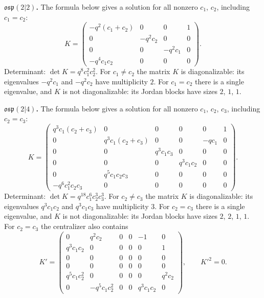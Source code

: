 \documentclass[12pt,a4paper]{article}
\newcommand{\osp}{\mathfrak{osp}}
\begin{document}
\textbf{$\osp(2|2)$.} The formula below gives a solution for all nonzero $c_1$, $c_2$, including $c_1=c_2$:
\begin{equation}  \label{Kosp(2|2)}
K=\begin{pmatrix}
-q^{2}(c_1+c_2) & 0 & 0 & 1 \\
0 & -q^{2}c_2 & 0 & 0 \\
0 & 0 & -q^{2}c_1 & 0 \\
-q^{4}c_1c_2 & 0 & 0 & 0
\end{pmatrix} .
\end{equation}
Determinant: $\det K=q^{8}c_1^2c_2^2$.
For $c_1\neq c_2$ the matrix $K$ is diagonalizable: its eigenvalues $-q^2c_1$ and $-q^2c_2$ have multiplicity $2$. For
$c_1=c_2$ there is a single eigenvalue, and $K$ is not diagonalizable: its Jordan blocks have sizes $2$, $1$, $1$.

\textbf{$\osp(2|4)$.} The formula below gives a solution for all nonzero $c_1$, $c_2$, $c_3$, including $c_2=c_3$:
\begin{equation}
K=\begin{pmatrix} \label{Kosp(2|4)}
q^{3}c_1(c_2+c_3) & 0 & 0 & 0 & 0 & 1 \\
0 & q^{3}c_1(c_2+c_3) & 0 & 0 & -qc_1 & 0 \\
0 & 0 & q^{3}c_1c_3 & 0 & 0 & 0 \\
0 & 0 & 0 & q^{3}c_1c_2 & 0 & 0 \\
0 & q^{5}c_1c_2c_3 & 0 & 0 & 0 & 0 \\
-q^{6}c_1^{2}c_2c_3 & 0 & 0 & 0 & 0 & 0
\end{pmatrix} .
\end{equation}
Determinant: $\det K=q^{18}c_1^6c_2^3c_3^3$.
For $c_2\neq c_3$ the matrix $K$ is diagonalizable: its eigenvalues $q^3c_1c_2$ and $q^3c_1c_3$ have multiplicity $3$.
For $c_2=c_3$ there is a single eigenvalue, and $K$ is not diagonalizable: its Jordan blocks have sizes $2$, $2$, $1$,
$1$. For $c_2=c_3$ the centralizer also contains
\begin{equation*}  %
K'=\begin{pmatrix}
0 & q^{2}c_2 & 0 & 0 & -1 & 0 \\
q^{3}c_1c_2 & 0 & 0 & 0 & 0 & 1 \\
0 & 0 & 0 & 0 & 0 & 0 \\
0 & 0 & 0 & 0 & 0 & 0 \\
q^{5}c_1c_2^{2} & 0 & 0 & 0 & 0 & q^{2}c_2 \\
0 & -q^{5}c_1c_2^{2} & 0 & 0 & q^{3}c_1c_2 & 0
\end{pmatrix},\qquad K'^2=0 .
\end{equation*}
\end{document}
